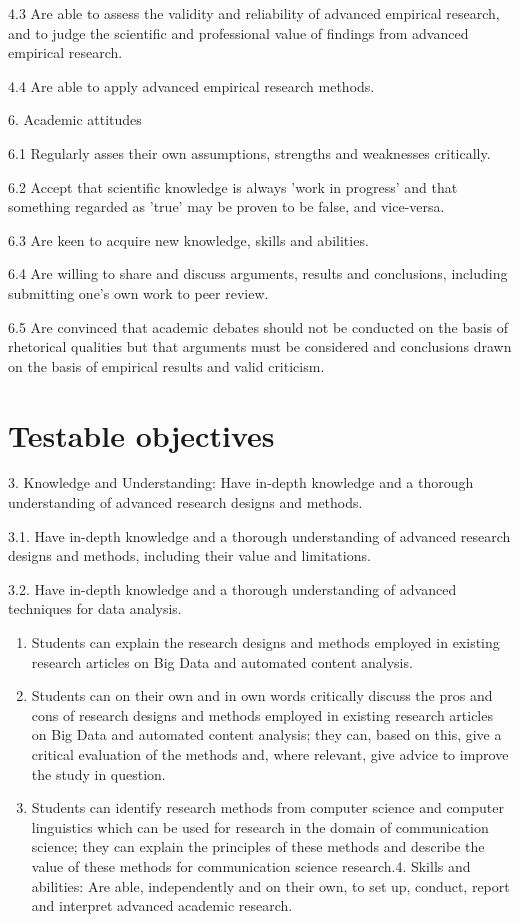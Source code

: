 \documentclass[a4paper,12pt]{report}
\begin{document}
4.3	Are able to assess the validity and reliability of advanced empirical research, and to judge the scientific and professional value of findings from advanced empirical research.


4.4	Are able to apply advanced empirical research methods.


6. Academic attitudes


6.1 	Regularly asses their own assumptions, strengths and weaknesses critically.


6.2	Accept that scientific knowledge is always 'work in progress' and that something regarded as 'true' may be proven to be false, and vice-versa.


6.3 	Are keen to acquire new knowledge, skills and abilities. 


6.4 	Are willing to share and discuss arguments, results and conclusions, including submitting one's own work to peer review. 


6.5 	Are convinced that academic debates should not be conducted on the basis of rhetorical qualities but that arguments must be considered and conclusions drawn on the basis of empirical results and valid criticism.



\chapter{Testable objectives}

{\footnotesize{
3. Knowledge and Understanding: Have in-depth knowledge and a thorough understanding of advanced research designs and methods. 


3.1. Have in-depth knowledge and a thorough understanding of advanced research designs and methods, including their value and limitations.


3.2.	Have in-depth knowledge and a thorough understanding of advanced techniques for data analysis.

}}

\begin{enumerate}[A]
\item Students can explain the research designs and methods employed in existing research articles on Big Data and automated content analysis.
\item Students can on their own and in own words critically discuss the pros and cons of research designs and methods employed in existing research articles on Big Data and automated content analysis; they can, based on this, give a critical evaluation of the methods and, where relevant, give advice to improve the study in question.
\item Students can identify research methods from computer science and computer linguistics which can be used for research in the domain of communication science; they can explain the principles of these methods and describe the value of these methods for communication science research.4. Skills and abilities: Are able, independently and on their own, to set up, conduct, report and interpret advanced academic research.
\end{enumerate}
\end{document}
